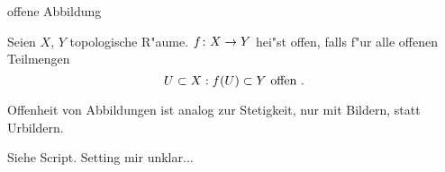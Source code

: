 \documentclass[class=article, crop=false]{standalone}
\begin{document}
\begin{zettel}{offene Abbildung}
\begin{flashcard}
	\begin{definition}
		Seien $X$, $Y$ topologische R"aume. $f \colon X\to Y$ hei"st offen, falls f"ur alle offenen Teilmengen
		\[
			U \subset X : f(U) \subset  Y \text{ offen }
		.\]
	\end{definition}
\end{flashcard}
\begin{remark}
	Offenheit von Abbildungen ist analog zur Stetigkeit, nur mit Bildern, statt Urbildern.
\end{remark}
\begin{corollary}
	Siehe Script. Setting mir unklar...
\end{corollary}
\end{zettel}
\end{document}
